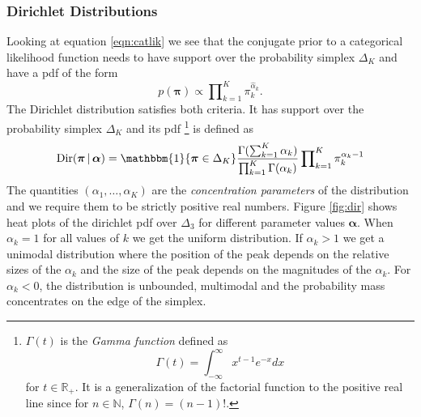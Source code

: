 \documentclass[final,3p,times,twocolumn]{elsarticle}
\DeclareMathOperator*{\Dir}{Dir}
\let\bs\boldsymbol
\begin{document}
\subsubsection*{\normalfont \small \bfseries Dirichlet Distributions}
Looking at equation \ref{eqn:catlik} we see that the conjugate prior to a categorical likelihood function needs to have support over the probability simplex $\Delta_K$ and have a pdf of the form 
\begin{equation}
p(\bs \pi) \propto \prod\nolimits_{k=1}^K \pi_k^{\hat\alpha_k}.
\end{equation}
The Dirichlet distribution satisfies both criteria. 
It has support over the probability simplex $\Delta_K$ and its pdf
\footnote{
$\Gamma(t)$ is the \emph{Gamma function} defined as 
\[
\Gamma(t) = \int\nolimits_{-\infty}^{\infty} x^{t-1} e^{-x} dx
\]	
for $t \in \mathbb{R}_+$.
It is a generalization of the factorial function to the positive real line since for $n\in \mathbb{N}$, $\Gamma(n) = (n-1)!$.
}
is defined as
\begin{equation}
\label{eqn:dirpdf}
\Dir(\bs \pi\,|\,\bs \alpha) = \mathbbm{1}\{\bs \pi \in \Delta_K\}\frac{\Gamma(\sum_{k=1}^K\alpha_k)}{\prod_{k=1}^K\Gamma(\alpha_k)}\prod\nolimits_{k=1}^K\pi_k^{\alpha_k - 1} 
\end{equation}
The quantities $(\alpha_1,\dots,\alpha_K)$ are the \emph{concentration parameters} of the distribution and we require them to be strictly positive real numbers. 
Figure \ref{fig:dir} shows heat plots of the dirichlet pdf over $\Delta_3$ for different parameter values $\bs \alpha$.
When $\alpha_k = 1$ for all values of $k$ we get the uniform distribution.
If $\alpha_k  > 1$ we get a unimodal distribution where the position of the peak depends on the relative sizes of the $\alpha_k$ and the size of the peak depends on the magnitudes of the $\alpha_k$.
For $\alpha_k < 0$, the distribution is unbounded, multimodal and the probability mass concentrates on the edge of the simplex.
\end{document}

